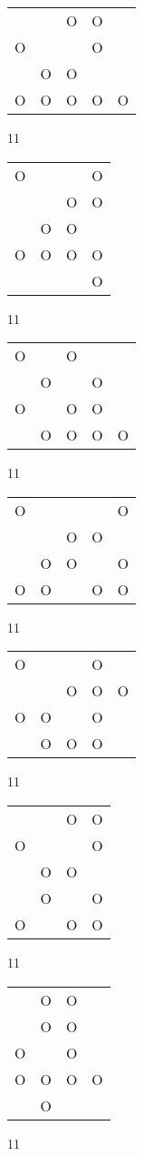 \begin{tabular}{|m{0.2cm}m{0.2cm}m{0.2cm}m{0.2cm}m{0.2cm}|}\hline
 & &O&O& \\
O& & &O& \\
 &O&O& & \\
O&O&O&O&O\\
\hline\end{tabular}11
\begin{tabular}{|m{0.2cm}m{0.2cm}m{0.2cm}m{0.2cm}|}\hline
O& & &O\\
 & &O&O\\
 &O&O& \\
O&O&O&O\\
 & & &O\\
\hline\end{tabular}11
\begin{tabular}{|m{0.2cm}m{0.2cm}m{0.2cm}m{0.2cm}m{0.2cm}|}\hline
O& &O& & \\
 &O& &O& \\
O& &O&O& \\
 &O&O&O&O\\
\hline\end{tabular}11
\begin{tabular}{|m{0.2cm}m{0.2cm}m{0.2cm}m{0.2cm}m{0.2cm}|}\hline
O& & & &O\\
 & &O&O& \\
 &O&O& &O\\
O&O& &O&O\\
\hline\end{tabular}11
\begin{tabular}{|m{0.2cm}m{0.2cm}m{0.2cm}m{0.2cm}m{0.2cm}|}\hline
O& & &O& \\
 & &O&O&O\\
O&O& &O& \\
 &O&O&O& \\
\hline\end{tabular}11
\begin{tabular}{|m{0.2cm}m{0.2cm}m{0.2cm}m{0.2cm}|}\hline
 & &O&O\\
O& & &O\\
 &O&O& \\
 &O& &O\\
O& &O&O\\
\hline\end{tabular}11
\begin{tabular}{|m{0.2cm}m{0.2cm}m{0.2cm}m{0.2cm}|}\hline
 &O&O& \\
 &O&O& \\
O& &O& \\
O&O&O&O\\
 &O& & \\
\hline\end{tabular}11
